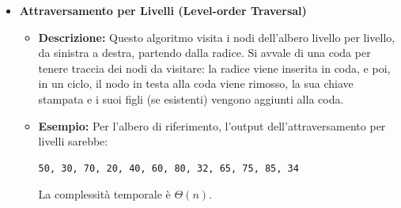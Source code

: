\begin{itemize}
    \item \textbf{Attraversamento per Livelli (Level-order Traversal)}
    \begin{itemize}
        \item \textbf{Descrizione:} Questo algoritmo visita i nodi dell'albero livello per livello, da sinistra a destra, partendo dalla radice. Si avvale di una coda per tenere traccia dei nodi da visitare: la radice viene inserita in coda, e poi, in un ciclo, il nodo in testa alla coda viene rimosso, la sua chiave stampata e i suoi figli (se esistenti) vengono aggiunti alla coda.

        \item \textbf{Esempio:} Per l'albero di riferimento, l'output dell'attraversamento per livelli sarebbe:
        \begin{verbatim}
50, 30, 70, 20, 40, 60, 80, 32, 65, 75, 85, 34
        \end{verbatim}
        La complessità temporale è $\Theta(n)$.
    \end{itemize}
\end{itemize}